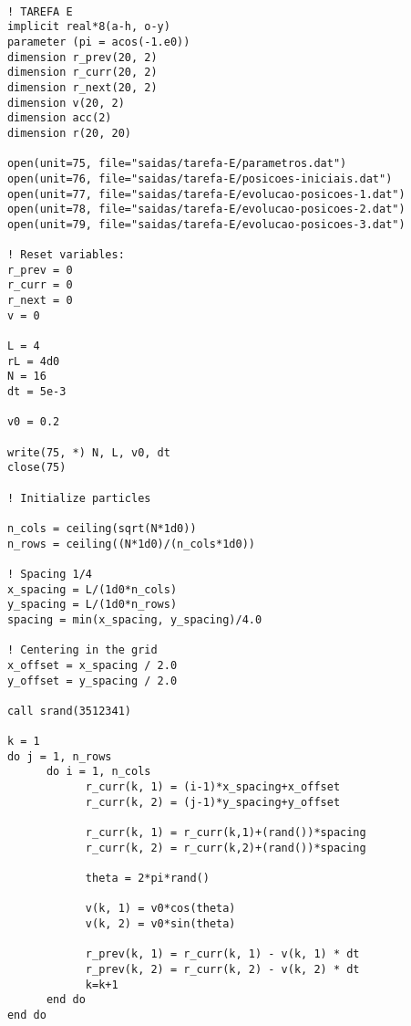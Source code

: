 \begin{verbatim}

      ! TAREFA E 
      implicit real*8(a-h, o-y)
      parameter (pi = acos(-1.e0))
      dimension r_prev(20, 2)
      dimension r_curr(20, 2)
      dimension r_next(20, 2)
      dimension v(20, 2)
      dimension acc(2)
      dimension r(20, 20)

      open(unit=75, file="saidas/tarefa-E/parametros.dat")
      open(unit=76, file="saidas/tarefa-E/posicoes-iniciais.dat")
      open(unit=77, file="saidas/tarefa-E/evolucao-posicoes-1.dat")
      open(unit=78, file="saidas/tarefa-E/evolucao-posicoes-2.dat")
      open(unit=79, file="saidas/tarefa-E/evolucao-posicoes-3.dat")

      ! Reset variables: 
      r_prev = 0
      r_curr = 0
      r_next = 0
      v = 0

      L = 4
      rL = 4d0
      N = 16
      dt = 5e-3

      v0 = 0.2

      write(75, *) N, L, v0, dt 
      close(75)

      ! Initialize particles 

      n_cols = ceiling(sqrt(N*1d0))
      n_rows = ceiling((N*1d0)/(n_cols*1d0)) 
      
      ! Spacing 1/4 
      x_spacing = L/(1d0*n_cols)
      y_spacing = L/(1d0*n_rows)
      spacing = min(x_spacing, y_spacing)/4.0 
      
      ! Centering in the grid
      x_offset = x_spacing / 2.0 
      y_offset = y_spacing / 2.0
      
      call srand(3512341)

      k = 1 
      do j = 1, n_rows 
            do i = 1, n_cols 
                  r_curr(k, 1) = (i-1)*x_spacing+x_offset
                  r_curr(k, 2) = (j-1)*y_spacing+y_offset
                  
                  r_curr(k, 1) = r_curr(k,1)+(rand())*spacing
                  r_curr(k, 2) = r_curr(k,2)+(rand())*spacing
                  
                  theta = 2*pi*rand()
                  
                  v(k, 1) = v0*cos(theta)
                  v(k, 2) = v0*sin(theta)
                  
                  r_prev(k, 1) = r_curr(k, 1) - v(k, 1) * dt 
                  r_prev(k, 2) = r_curr(k, 2) - v(k, 2) * dt 
                  k=k+1
            end do 
      end do


\end{verbatim}
